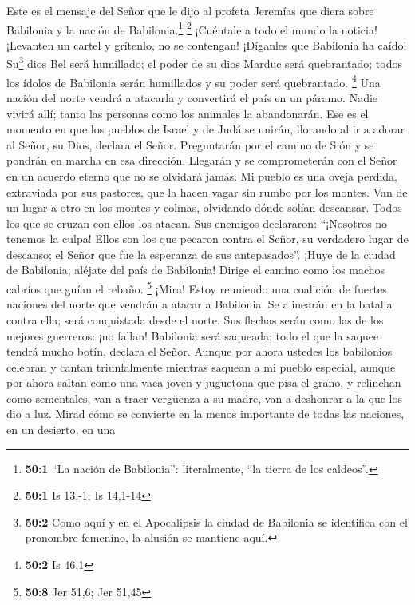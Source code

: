  Este es el mensaje del Señor que le dijo al profeta
Jeremías que diera sobre Babilonia y la nación de Babilonia.\footnote{\textbf{50:1}
  ``La nación de Babilonia'': literalmente, ``la tierra de los
  caldeos''.} \footnote{\textbf{50:1} Is 13,-1; Is 14,1-14}
 ¡Cuéntale a todo el mundo la noticia! ¡Levanten un cartel
y grítenlo, no se contengan! ¡Díganles que Babilonia ha caído!
Su\footnote{\textbf{50:2} Como aquí y en el Apocalipsis la ciudad de
  Babilonia se identifica con el pronombre femenino, la alusión se
  mantiene aquí.} dios Bel será humillado; el poder de su dios Marduc
será quebrantado; todos los ídolos de Babilonia serán humillados y su
poder será quebrantado. \footnote{\textbf{50:2} Is 46,1} 
Una nación del norte vendrá a atacarla y convertirá el país en un
páramo. Nadie vivirá allí; tanto las personas como los animales la
abandonarán.  Ese es el momento en que los pueblos de
Israel y de Judá se unirán, llorando al ir a adorar al Señor, su Dios,
declara el Señor.  Preguntarán por el camino de Sión y se
pondrán en marcha en esa dirección. Llegarán y se comprometerán con el
Señor en un acuerdo eterno que no se olvidará jamás.  Mi
pueblo es una oveja perdida, extraviada por sus pastores, que la hacen
vagar sin rumbo por los montes. Van de un lugar a otro en los montes y
colinas, olvidando dónde solían descansar.  Todos los que
se cruzan con ellos los atacan. Sus enemigos declararon: ``¡Nosotros no
tenemos la culpa! Ellos son los que pecaron contra el Señor, su
verdadero lugar de descanso; el Señor que fue la esperanza de sus
antepasados''.  ¡Huye de la ciudad de Babilonia; aléjate
del país de Babilonia! Dirige el camino como los machos cabríos que
guían el rebaño. \footnote{\textbf{50:8} Jer 51,6; Jer 51,45}
 ¡Mira! Estoy reuniendo una coalición de fuertes naciones
del norte que vendrán a atacar a Babilonia. Se alinearán en la batalla
contra ella; será conquistada desde el norte. Sus flechas serán como las
de los mejores guerreros: ¡no fallan!  Babilonia será
saqueada; todo el que la saquee tendrá mucho botín, declara el Señor.
 Aunque por ahora ustedes los babilonios celebran y
cantan triunfalmente mientras saquean a mi pueblo especial, aunque por
ahora saltan como una vaca joven y juguetona que pisa el grano, y
relinchan como sementales,  van a traer vergüenza a su
madre, van a deshonrar a la que los dio a luz. Mirad cómo se convierte
en la menos importante de todas las naciones, en un desierto, en una
